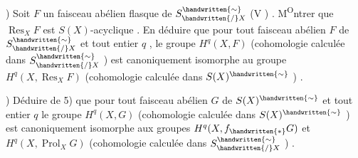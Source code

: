 ) Soit \(F\) un faisceau abélien flasque de \(S^{\handwritten{\sim}}_{\handwritten{/}X}\) (V ) . M\textsuperscript{O}ntrer que \(\operatorname{Res}_X F\) est \(S(X)\)-acyclique%
\reversemarginpar
{}
\normalmarginpar . En déduire que pour tout faisceau abélien \(F\) de \(S^{\handwritten{\sim}}_{\handwritten{/}X}\) et tout entier \(q\) , le groupe \(H^q(X,F)\) (cohomologie calculée dans \(S^{\handwritten{\sim}}_{\handwritten{/}X}\) ) est canoniquement isomorphe au groupe \(H^q(X,\operatorname{Res}_X F)\) (cohomologie calculée dans \(S(X)^{\handwritten{\sim}}\) ) .

) Déduire de 5) que pour tout faisceau abélien \(G\)  de \(S(X)^{\handwritten{\sim}}\) et tout entier \(q\) le groupe \(H^q(X,G)\)  (cohomologie calculée dans \(S(X)^{\handwritten{\sim}}\) ) est canoniquement isomorphe aux groupes \(H^q(X,f_{\handwritten{*}}G)\) et \(H^q(X,\operatorname{Prol}_X G)\) (cohomologie calculée dans \(S^{\handwritten{\sim}}_{\handwritten{/}X}\) ) .
